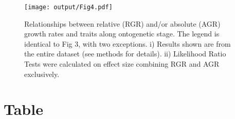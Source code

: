\documentclass[a4paper,11pt]{article}
\begin{document}
\begin{figure}[h!]
\centering
\texttt{[image: output/Fig4.pdf]}
\caption{Relationships between relative (RGR) and/or absolute (AGR) growth rates and traits along ontogenetic stage. The legend is identical to Fig 3, with two exceptions. i) Results shown are from the entire dataset (see methods for details). ii) Likelihood Ratio Tests were calculated on effect size combining RGR and AGR exclusively.}
\label{fig:fig4}
\end{figure}

\clearpage
\section*{Table}
\setcounter{table}{0}

\newcommand{\sepp}{{\color{grey}/}}
\end{document}
